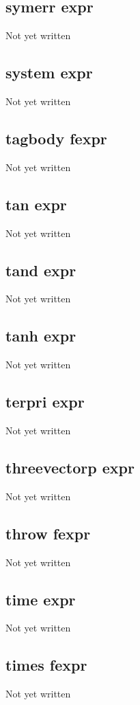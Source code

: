 \documentclass[a4paper,11pt]{article}
\begin{document}
\subsection{\ttfamily symerr expr}
Not yet written

\subsection{\ttfamily system expr}
Not yet written

\subsection{\ttfamily tagbody fexpr}
Not yet written

\subsection{\ttfamily tan expr}
Not yet written

\subsection{\ttfamily tand expr}
Not yet written

\subsection{\ttfamily tanh expr}
Not yet written

\subsection{\ttfamily terpri expr}
Not yet written

\subsection{\ttfamily threevectorp expr}
Not yet written

\subsection{\ttfamily throw fexpr}
Not yet written

\subsection{\ttfamily time expr}
Not yet written

\subsection{\ttfamily times fexpr}
Not yet written
\end{document}

